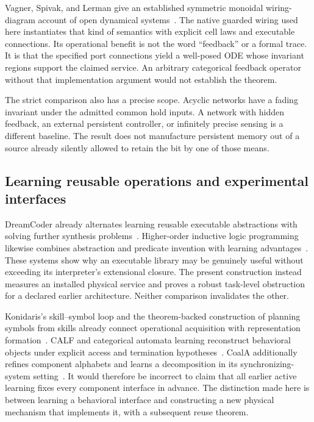 \documentclass[11pt]{article}
\theoremstyle{definition}
\theoremstyle{remark}
\begin{document}
Vagner, Spivak, and Lerman give an established symmetric monoidal
wiring-diagram account of open dynamical systems~\cite{VSL2015}.
The native guarded wiring used here instantiates that kind of semantics
with explicit cell laws and executable connections. Its operational
benefit is not the word ``feedback'' or a formal trace. It is that the
specified port connections yield a well-posed ODE whose invariant regions
support the claimed service. An arbitrary categorical feedback operator
without that implementation argument would not establish the theorem.

The strict comparison also has a precise scope. Acyclic networks have a
fading invariant under the admitted common hold inputs. A network with
hidden feedback, an external persistent controller, or infinitely precise
sensing is a different baseline. The result does not manufacture
persistent memory out of a source already silently allowed to retain the
bit by one of those means.

\subsection{Learning reusable operations and experimental interfaces}
DreamCoder already alternates learning reusable executable abstractions
with solving further synthesis problems~\cite{DreamCoder}. Higher-order
inductive logic programming likewise combines abstraction and predicate
invention with learning advantages~\cite{CropperMuggleton2016}.
These systems show why an executable library may be genuinely useful
without exceeding its interpreter's extensional closure. The present
construction instead measures an installed physical service and proves a
robust task-level obstruction for a declared earlier architecture.
Neither comparison invalidates the other.

Konidaris's skill--symbol loop and the theorem-backed construction of
planning symbols from skills already connect operational acquisition
with representation formation~\cite{Konidaris2016,KKL2018}.
CALF and categorical automata learning reconstruct behavioral objects
under explicit access and termination hypotheses~\cite{CALF,FunLstar}.
CoalA additionally refines component alphabets and learns a decomposition
in its synchronizing-system setting~\cite{CoalA2025}. It would therefore
be incorrect to claim that all earlier active learning fixes every
component interface in advance. The distinction made here is between
learning a behavioral interface and constructing a new physical mechanism
that implements it, with a subsequent reuse theorem.
\end{document}
